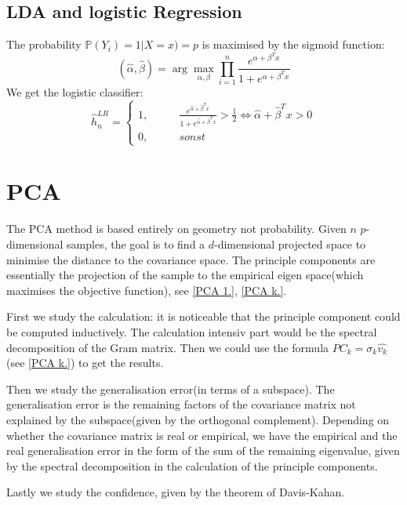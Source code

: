 \subsection{LDA and logistic Regression}
\begin{method}
The probability $\mathbb{P}(Y_i) = 1 | X = x) = p$ is maximised by the sigmoid function:
\begin{equation*}
	(\hat{\alpha}, \hat{\beta}) = \arg \max_{\alpha, \beta} \prod_{i = 1}^n \frac{e^{\alpha + \beta^Tx}}{1 + e^{\alpha + \beta^Tx}}
\end{equation*}
We get the logistic classifier:
\begin{equation*}
	\hat{h}_n^{LR} = 
	\left\{\begin{aligned}
		  1, \qquad &\frac{e^{\hat{\alpha} + \hat{\beta}^Tx}}{1 + e^{\hat{\alpha} + \hat{\beta}^Tx}} > \frac{1}{2} \Leftrightarrow \hat{\alpha} + \hat{\beta}^Tx > 0\\
		  0, \qquad &sonst
	\end{aligned}\right.
\end{equation*}	
\end{method}



\section{PCA}
The PCA method is based entirely on geometry not probability. Given $n$ $p$-dimensional samples, the goal is to find a $d$-dimensional projected space to minimise the distance to the covariance space. The principle components are essentially the projection of the sample to the empirical eigen space(which maximises the objective function), see \ref{PCA 1.}, \ref{PCA k.}. \par 
First we study the calculation: it is noticeable that the principle component could be computed inductively. The calculation intensiv part would be the spectral decomposition of the Gram matrix. Then we could use the formula $PC_k = \sigma_k \hat{v_k}$(see \ref{PCA k.}) to get the results. \par 
Then we study the generalisation error(in terms of a subspace). The generalisation error is the remaining factors of the covariance matrix not explained by the subspace(given by the orthogonal complement). Depending on whether the covariance matrix is real or empirical, we have the empirical and the real generalisation error in the form of the sum of the remaining eigenvalue, given by the spectral decomposition in the calculation of the principle components. \par 
Lastly we study the confidence, given by the theorem of Davis-Kahan. 


